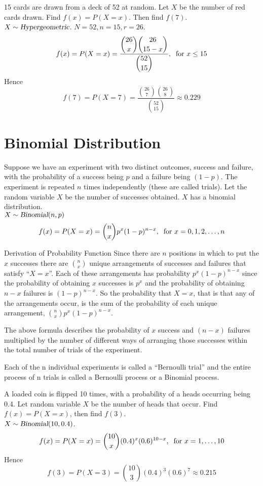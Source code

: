 \begin{example}
15 cards are drawn from a deck of 52 at random. Let $X$ be the number of red cards drawn. Find $f(x)=P(X=x)$. Then find $f(7)$. \\
$X\sim\operatorname{\textsl{Hypergeometric}}$. $N=52,n=15,r=26$.
\[
    f(x) = P(X = x) = \displaystyle\frac{\displaystyle\binom{26}{x} \binom{26}{15-x}} {\displaystyle\binom{52}{15}},\:\text{ for } x \leq 15
\]
Hence \[
    f(7) = P(X = 7) = \displaystyle\frac{\displaystyle\binom{26}{7} \binom{26}{8}} {\displaystyle\binom{52}{15}} \approx 0.229
\]
\end{example}
\section{Binomial Distribution}
Suppose we have an experiment with two distinct outcomes, success and failure, with the probability of a success being $p$ and a failure being $(1-p)$. The experiment is repeated $n$ times independently (these are called trials). Let the random variable $X$ be the number of successes obtained. $X$ has a binomial distribution. \\
$X\sim\operatorname{\textsl{Binomial}}(n,p)$
\[
    f(x) = P(X = x) = \displaystyle\binom{n}{x}p^x (1-p)^{n-x},\:\text{ for } x=0,1,2,\ldots,n
\]
\begin{theory}{Derivation of Probability Function}
Since there are $n$ positions in which to put the $x$ successes there are $\binom{n}{x}$ unique arrangements of successes and failures that satisfy ``$X = x$''. Each of these arrangements has probability $p^x (1-p)^{n-x}$ since the probability of obtaining $x$ successes is $p^x$ and the probability of obtaining $n-x$ failures is $(1-p)^{n-x}$. So the probability that $X = x$, that is that any of the arrangements occur, is the sum of the probability of each unique arrangement, $\binom{n}{x}p^x (1-p)^{n-x}$.
\end{theory}
\begin{info}
The above formula describes the probability of $x$ success and $(n-x)$ failures multiplied by the number of different ways of arranging those successes within the total number of trials of the experiment.
\end{info}
\begin{info}
Each of the n individual experiments is called a ``Bernoulli trial'' and the entire process of n trials is called a Bernoulli process or a Binomial process.
\end{info}
\begin{example}
A loaded coin is flipped 10 times, with a probability of a heads occurring being 0.4. Let random variable $X$ be the number of heads that occur. Find $f(x)=P(X=x)$, then find $f(3)$. \\
$X\sim\operatorname{\textsl{Binomial}}(10,0.4)$.
\[
    f(x) = P(X = x) = \displaystyle\binom{10}{x} (0.4)^x (0.6)^{10-x},\:\text{ for } x = 1,\ldots,10
\]
Hence 
\[
    f(3) = P(X = 3) = \displaystyle\binom{10}{3} (0.4)^3 (0.6)^7 \approx 0.215
\]
\end{example}
